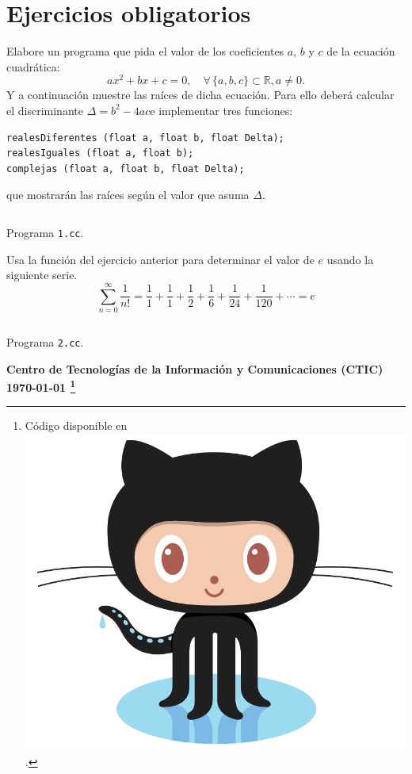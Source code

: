 \documentclass[spanish,addpoints,answers,a4paper]{exam}
\newcommand{\unmarkedfntext}[1]{%
	\begingroup
	\renewcommand\thefootnote{}\footnote{#1}%
	\addtocounter{footnote}{-1}%
	\endgroup
}
\newcommand{\mychar}{%
	\begingroup\normalfont
	\includegraphics[height=\fontcharht\font`\B]{Octocat.png}%
	\endgroup
}
\begin{document}
\section*{Ejercicios obligatorios}

\begin{questions}

\question Elabore un programa que pida el valor de los coeficientes $a$, $b$ y $c$ de la ecuación cuadrática:
\begin{equation*}
ax^2+bx+c=0,\quad\forall\,\{a, b, c\}\subset\mathbb{R}, a\neq 0.
\end{equation*}
Y a continuación muestre las raíces de dicha ecuación. Para ello deberá calcular el discriminante $\Delta = b^2-4ac$\linebreak e implementar tres funciones:
\begin{verbatim}
realesDiferentes (float a, float b, float Delta);
realesIguales (float a, float b);
complejas (float a, float b, float Delta);
\end{verbatim}
que mostrarán las raíces según el valor que asuma $\Delta$.

\begin{solution}
	\begin{listing}[H]
		\footnotesize
		\inputminted{cpp}{1.cc}
		\caption{Programa \texttt{1.cc}.}
		\label{lst:1.9}
\end{listing}
\end{solution}

\question Usa la función del ejercicio anterior para determinar el valor de $e$ usando la siguiente serie.
\begin{equation*}
\sum_{n=0}^\infty\frac{1}{n!}=\frac{1}{1}+\frac{1}{1}+\frac{1}{2}+\frac{1}{6}+\frac{1}{24}+\frac{1}{120}+\cdots=e
\end{equation*}

\begin{solution}
	\begin{listing}[H]
		\footnotesize
		\inputminted{cpp}{2.cc}
		\caption{Programa \texttt{2.cc}.}
		\label{lst:1.10}
\end{listing}
\end{solution}

\end{questions}

\begin{flushright}\bfseries
Centro de Tecnologías de la Información y Comunicaciones (CTIC)\\[2mm]
\today\unmarkedfntext{Código disponible en \href{https://github.com/carlosal1015/Cpp-Programming}{\mychar{}}.}
\end{flushright}
\end{document}
